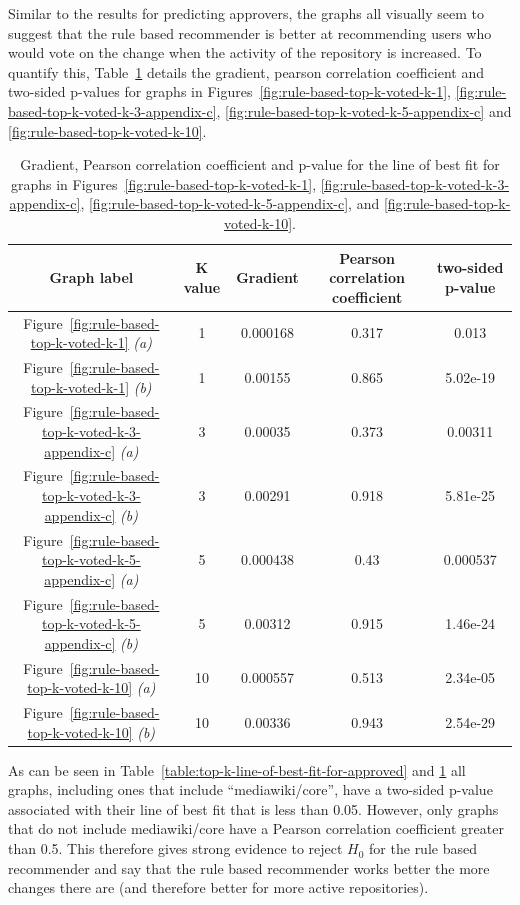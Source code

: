 Similar to the results for predicting approvers, the graphs all visually seem to suggest that the rule based recommender is better at recommending users who would vote on the change when the activity of the repository is increased. To quantify this, Table~\ref{table:top-k-line-of-best-fit-for-voted} details the gradient, pearson correlation coefficient and two-sided p-values for graphs in Figures~\ref{fig:rule-based-top-k-voted-k-1}, \ref{fig:rule-based-top-k-voted-k-3-appendix-c}, \ref{fig:rule-based-top-k-voted-k-5-appendix-c} and \ref{fig:rule-based-top-k-voted-k-10}.

\begin{table}[H]
    \centering
    \begin{tabular}{@{}c c c c c@{}} 
    \hline
    \textbf{Graph label} & \textbf{K value} & \textbf{Gradient} & \textbf{Pearson correlation coefficient} & \textbf{two-sided p-value} \\
    \hline
Figure~\ref{fig:rule-based-top-k-voted-k-1} \emph{(a)} & 1 & 0.000168 & 0.317 & 0.013 \\
Figure~\ref{fig:rule-based-top-k-voted-k-1} \emph{(b)} & 1 & 0.00155 & 0.865 & 5.02e-19 \\
Figure~\ref{fig:rule-based-top-k-voted-k-3-appendix-c} \emph{(a)} & 3 & 0.00035 & 0.373 & 0.00311 \\
Figure~\ref{fig:rule-based-top-k-voted-k-3-appendix-c} \emph{(b)} & 3 & 0.00291 & 0.918 & 5.81e-25 \\
Figure~\ref{fig:rule-based-top-k-voted-k-5-appendix-c} \emph{(a)} & 5 & 0.000438 & 0.43 & 0.000537 \\
Figure~\ref{fig:rule-based-top-k-voted-k-5-appendix-c} \emph{(b)} & 5 & 0.00312 & 0.915 & 1.46e-24 \\
Figure~\ref{fig:rule-based-top-k-voted-k-10} \emph{(a)} & 10 & 0.000557 & 0.513 & 2.34e-05 \\
Figure~\ref{fig:rule-based-top-k-voted-k-10} \emph{(b)} & 10 & 0.00336 & 0.943 & 2.54e-29 \\
    \hline
    \end{tabular}
    \caption{Gradient, Pearson correlation coefficient and p-value for the line of best fit for graphs in Figures~\ref{fig:rule-based-top-k-voted-k-1}, \ref{fig:rule-based-top-k-voted-k-3-appendix-c}, \ref{fig:rule-based-top-k-voted-k-5-appendix-c}, and \ref{fig:rule-based-top-k-voted-k-10}.}
    \label{table:top-k-line-of-best-fit-for-voted}
\end{table}

As can be seen in Table~\ref{table:top-k-line-of-best-fit-for-approved} and \ref{table:top-k-line-of-best-fit-for-voted} all graphs, including ones that include ``mediawiki/core'', have a two-sided p-value associated with their line of best fit that is less than 0.05. However, only graphs that do not include mediawiki/core have a Pearson correlation coefficient greater than 0.5. This therefore gives strong evidence to reject \(H_0\) for the rule based recommender and say that the rule based recommender works better the more changes there are (and therefore better for more active repositories).

